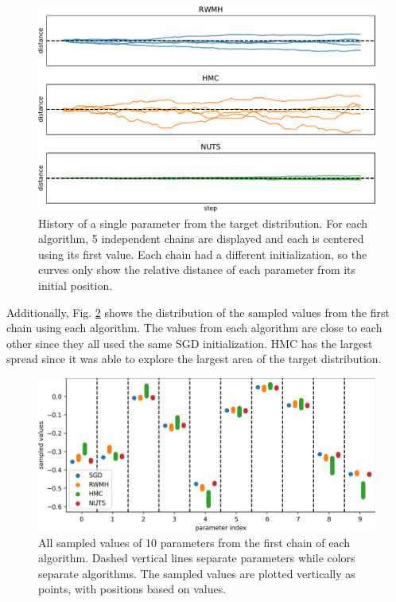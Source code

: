 \documentclass[12pt]{article}
\begin{document}
\begin{figure}[H]
\centering
\includegraphics[width=16cm]{plots/uci_param_history.pdf}
\caption{History of a single parameter from the target distribution. For each algorithm, 5 independent chains are displayed and each is centered using its first value. Each chain had a different initialization, so the curves only show the relative distance of each parameter from its initial position.}
\label{fig_uci_param_history}
\end{figure}

Additionally, Fig. \ref{fig_uci_param_distribution} shows the distribution of the sampled values from the first chain using each algorithm. The values from each algorithm are close to each other since they all used the same SGD initialization. HMC has the largest spread since it was able to explore the largest area of the target distribution.

\begin{figure}[H]
\centering
\includegraphics[width=15cm]{plots/uci_param_distribution.png}
\caption{All sampled values of 10 parameters from the first chain of each algorithm. Dashed vertical lines separate parameters while colors separate algorithms. The sampled values are plotted vertically as points, with positions based on values.}
\label{fig_uci_param_distribution}
\end{figure}
\end{document}
